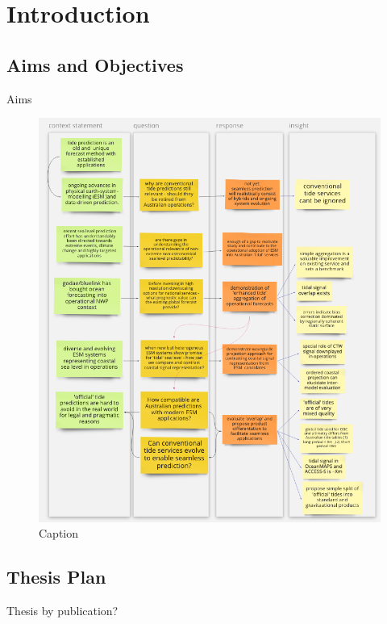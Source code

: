 \chapter{Introduction}

\section{Aims and Objectives}\label{s:aims}
Aims
\begin{figure}[h]
    \centering
    \includegraphics[width=\textwidth]{figures/diagrams/thesis_overview.png}
    \caption{Caption}
    \label{fig:my_label}
\end{figure}

\section{Thesis Plan}\label{s:thesisplan}
Thesis by publication?












